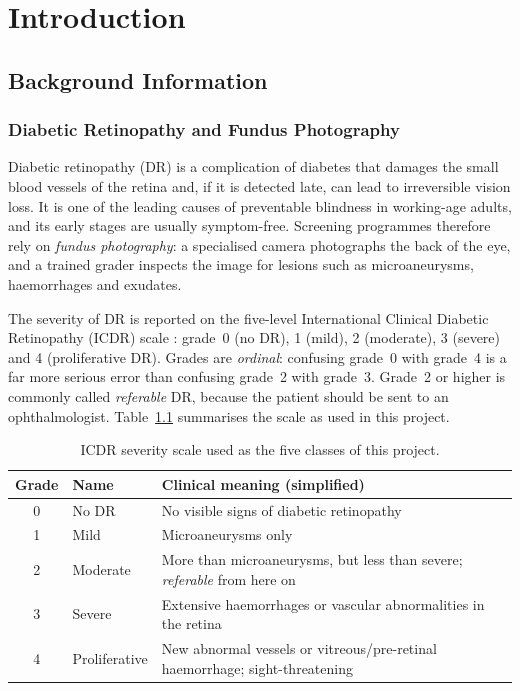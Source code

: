 \chapter{Introduction}
\label{chap:introduction}

\section{Background Information}
\label{sec:background}

\subsection{Diabetic Retinopathy and Fundus Photography}
\label{subsec:dr_fundus}

Diabetic retinopathy (DR) is a complication of diabetes that damages the small blood vessels of the retina and, if it is detected late, can lead to irreversible vision loss. It is one of the leading causes of preventable blindness in working-age adults, and its early stages are usually symptom-free. Screening programmes therefore rely on \emph{fundus photography}: a specialised camera photographs the back of the eye, and a trained grader inspects the image for lesions such as microaneurysms, haemorrhages and exudates.

The severity of DR is reported on the five-level International Clinical Diabetic Retinopathy (ICDR) scale \cite{icdr2003}: grade~0 (no DR), 1 (mild), 2 (moderate), 3 (severe) and 4 (proliferative DR). Grades are \emph{ordinal}: confusing grade~0 with grade~4 is a far more serious error than confusing grade~2 with grade~3. Grade~2 or higher is commonly called \emph{referable} DR, because the patient should be sent to an ophthalmologist. Table~\ref{tab:icdr} summarises the scale as used in this project.

\begin{table}[htbp]
    \centering
    \caption{ICDR severity scale used as the five classes of this project.}
    \label{tab:icdr}
    \begin{tabularx}{\textwidth}{c l X}
        \toprule
        \textbf{Grade} & \textbf{Name} & \textbf{Clinical meaning (simplified)} \\
        \midrule
        0 & No DR            & No visible signs of diabetic retinopathy \\
        1 & Mild             & Microaneurysms only \\
        2 & Moderate         & More than microaneurysms, but less than severe; \emph{referable} from here on \\
        3 & Severe           & Extensive haemorrhages or vascular abnormalities in the retina \\
        4 & Proliferative    & New abnormal vessels or vitreous/pre-retinal haemorrhage; sight-threatening \\
        \bottomrule
    \end{tabularx}
\end{table}

